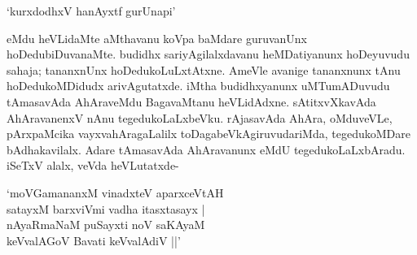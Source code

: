 \begin{shloka}
`kurxdodhxV hanAyxtf gurUnapi'
\end{shloka}

\noindent eMdu heVLidaMte aMthavanu koVpa baMdare guruvanUnx hoDedubiDuvanaMte. budidhx sariyAgilalxdavanu heMDatiyanunx hoDeyuvudu sahaja; tananxnUnx hoDedukoLuLxtAtxne. AmeVle avanige tananxnunx tAnu hoDedukoMDidudx arivAgutatxde. iMtha budidhxyanunx uMTumADuvudu tAmasavAda AhAraveMdu BagavaMtanu heVLidAdxne. sAtitxvXkavAda AhAravanenxV nAnu tegedukoLaLxbeVku. rAjasavAda AhAra, oMduveVLe, pArxpaMcika vayxvahAragaLalilx toDagabeVkAgiruvudariMda, tegedukoMDare bAdhakavilalx. Adare tAmasavAda AhAravanunx eMdU tegedukoLaLxbAradu. iSeTxV alalx, veVda heVLutatxde-

\begin{shloka}
`moVGamananxM vinadxteV aparxceVtAH\\
satayxM barxviVmi vadha itasxtasayx |\\
nAyaRmaNaM puSayxti noV saKAyaM\\
keVvalAGoV Bavati keVvalAdiV ||'
\end{shloka}

